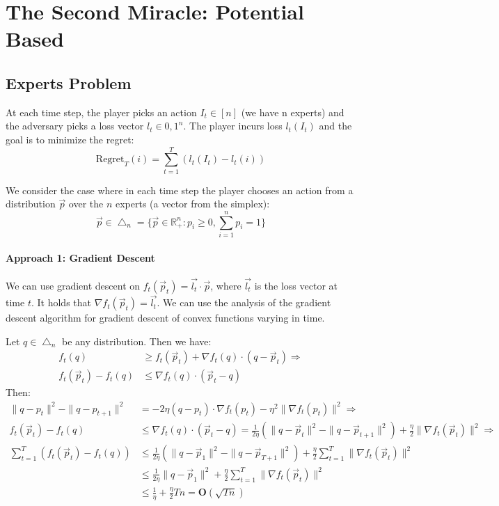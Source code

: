 \documentclass[11pt]{book} %
\begin{document}
\chapter{The Second Miracle: Potential Based}

\section{Experts Problem}

At each time step, the player picks an action $I_t \in [n]$ (we have n experts) and the adversary picks a loss vector $l_t \in {0,1}^n$. 
The player incurs loss $l_t(I_t)$ and the goal is to minimize the regret:
\begin{equation}
    \text{Regret}_T(i) = \sum_{t=1}^T \left( l_t(I_t) - l_t(i) \right)
\end{equation}

We consider the case where in each time step the player chooses an action from a distribution $\vec{p}$ over the $n$ experts (a vector from the simplex):
\begin{equation*}
    \vec{p} \in \bigtriangleup_n = \{ \vec{p} \in \mathbb{R}_+^n : p_i \geq 0, \sum_{i=1}^n p_i = 1 \}
\end{equation*}

\subsubsection{Approach 1: Gradient Descent}
We can use gradient descent on $f_t(\vec{p}_t) = \vec{l_t} \cdot \vec{p}$, where $\vec{l_t}$ is the loss vector at time $t$.
It holds that $\nabla f_t(\vec{p}_t) = \vec{l_t}$. We can use the analysis of the gradient descent algorithm for gradient descent of convex functions varying in time.

Let $q \in \bigtriangleup_n$ be any distribution. Then we have:
\begin{align*}
    f_t(q) &\geq f_t(\vec{p}_t) + \nabla f_t(q) \cdot (q - \vec{p}_t) \Longrightarrow \\
    f_t(\vec{p}_t) - f_t(q) &\leq \nabla f_t(q) \cdot (\vec{p}_t - q) 
\end{align*}
Then:
\begin{align*}
    \| q - p_t \|^2 - \| q - p_{t+1} \|^2 &= - 2 \eta (q - p_t) \cdot \nabla f_t(p_t) - \eta^2 \| \nabla f_t(p_t) \|^2  \Longrightarrow \\
    f_t(\vec{p}_t) - f_t(q) &\leq \nabla f_t(q) \cdot (\vec{p}_t - q)  = \frac{1}{2\eta} \left( \| q - \vec{p}_t \|^2  - \| q - \vec{p}_{t+1} \|^2 \right) + \frac{\eta}{2} \| \nabla f_t(\vec{p}_t) \|^2 \Longrightarrow \\ 
    \sum_{t=1}^T \left( f_t(\vec{p}_t) - f_t(q) \right) &\leq \frac{1}{2\eta} \left( \| q - \vec{p}_1 \|^2 - \| q - \vec{p}_{T+1} \|^2 \right)+ \frac{\eta}{2} \sum_{t=1}^T \| \nabla f_t(\vec{p}_t) \|^2 \\
    &\leq \frac{1}{2\eta} \| q - \vec{p}_1 \|^2 + \frac{\eta}{2} \sum_{t=1}^T \| \nabla f_t(\vec{p}_t) \|^2 \\
    &\leq \frac{1}{\eta} + \frac{\eta}{2} T n  = \textbf{O} ( \sqrt{Tn} )
\end{align*}
\end{document}
